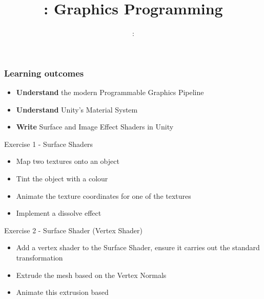 \usepackage{../../beamerthemeFalmouthGamesAcademy}
\usepackage{multimedia}
\graphicspath{ {../../} }

\usepackage[normalem]{ulem}
\usepackage{wasysym}

\usepackage{pdfpages}



\usetikzlibrary{arrows,automata}




\title{\sessionnumber: Graphics Programming}
\subtitle{\modulecode: \moduletitle}

\frame{\titlepage} 

\begin{frame}
	\frametitle{Learning outcomes}
	\begin{itemize}
		\item \textbf{Understand} the modern Programmable Graphics Pipeline
		\item \textbf{Understand} Unity's Material System
		\item \textbf{Write} Surface and Image Effect Shaders in Unity
	\end{itemize}
\end{frame}





\begin{frame}{Exercise 1 - Surface Shaders}
	\begin{itemize}
		\item Map two textures onto an object
		\item Tint the object with a colour
		\item Animate the texture coordinates for one of the textures
		\item Implement a dissolve effect
	\end{itemize}
\end{frame}

\begin{frame}{Exercise 2 - Surface Shader (Vertex Shader)}
	\begin{itemize}
		\item Add a vertex shader to the Surface Shader, ensure it carries out the standard transformation
		\item Extrude the mesh based on the Vertex Normals
		\item Animate this extrusion based
	\end{itemize}
\end{frame}


